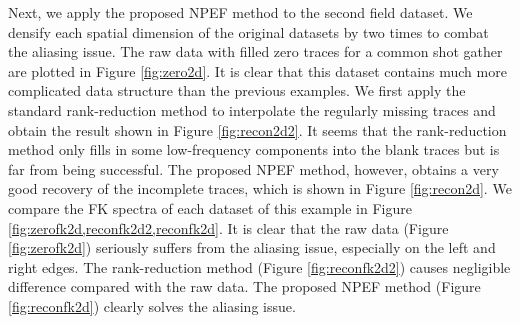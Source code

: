 Next, we apply the proposed NPEF method to the second field dataset. We densify each spatial dimension of the original datasets by two times to combat the aliasing issue. The raw data with filled zero traces for a common shot gather are plotted in Figure \ref{fig:zero2d}. It is clear that this dataset contains much more complicated data structure than the previous examples. We first apply the standard rank-reduction method to interpolate the regularly missing traces and obtain the result shown in Figure \ref{fig:recon2d2}. It seems that the rank-reduction method only fills in some low-frequency components into the blank traces but is far from being successful. The proposed NPEF method, however, obtains a very good recovery of the incomplete traces, which is shown in Figure \ref{fig:recon2d}. We compare the FK spectra of each dataset of this example in Figure \ref{fig:zerofk2d,reconfk2d2,reconfk2d}. It is clear that the raw data (Figure \ref{fig:zerofk2d}) seriously suffers from the aliasing issue, especially on the left and right edges. The rank-reduction method (Figure \ref{fig:reconfk2d2}) causes negligible difference compared with the raw data. The proposed NPEF method (Figure \ref{fig:reconfk2d}) clearly solves the aliasing issue.  


